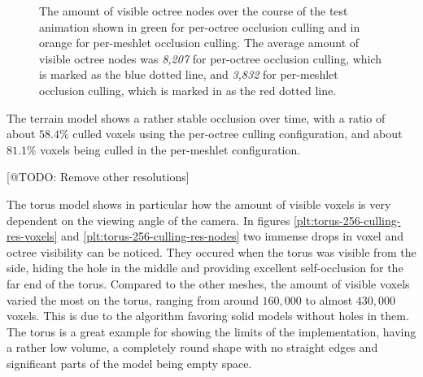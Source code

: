   \begin{figure}[h]            %
    \begin{center}
      \caption{The amount of visible octree nodes over the course of the test animation shown in green for 
      per-octree occlusion culling and in orange for per-meshlet occlusion culling. 
      The average amount of visible octree nodes was \emph{8,207} for per-octree occlusion culling, which is 
      marked as the blue dotted line, and \emph{3,832} for per-meshlet occlusion culling, which is marked in 
      as the red dotted line.}
      \label{plt:terrain-256-culling-res-nodes}
    \end{center}
  \end{figure}



\noindent
The terrain model shows a rather stable occlusion over time, with a ratio of about $58.4\%$ culled voxels 
using the per-octree culling configuration, and about $81.1\%$ voxels being culled in the per-meshlet 
configuration. 



[@TODO: Remove other resolutions]

\noindent
The torus model shows in particular how the amount of visible voxels is very dependent on the 
viewing angle of the camera. In figures \ref{plt:torus-256-culling-res-voxels} and 
\ref{plt:torus-256-culling-res-nodes} two immense drops in voxel and octree visibility can be noticed.
They occured when the torus was visible from the side, hiding the hole in the middle and providing excellent 
self-occlusion for the far end of the torus. Compared to the other meshes, the amount of visible voxels 
varied the most on the torus, ranging from around $160,000$ to almost $430,000$ voxels. This is due to the 
algorithm favoring solid models without holes in them. The torus is a great example for showing the limits of 
the implementation, having a rather low volume, a completely round shape with no straight edges and significant 
parts of the model being empty space. \\

